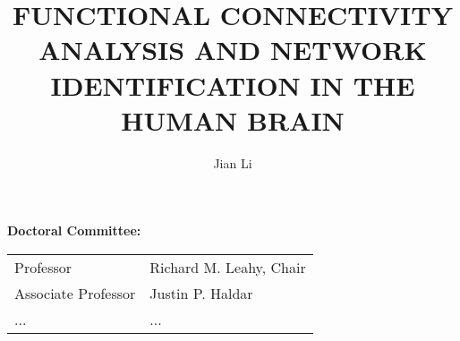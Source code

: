 \documentclass[twoside, 11pt]{report}
\begin{document}
\title{FUNCTIONAL CONNECTIVITY ANALYSIS AND NETWORK IDENTIFICATION IN THE HUMAN BRAIN}
\author{Jian Li}



\begin{preface}
  
  \thispagestyle{empty}
  {\large\textbf{Doctoral Committee:}} %
  
  \begin{singlespace}
    \renewcommand{\arraystretch}{1.3}
    \hspace*{5mm}
    \begin{tabular}{L{35mm}L{50mm}}
      Professor & Richard M. Leahy, Chair\\
      Associate Professor & Justin P. Haldar\\
      ... & ...
    \end{tabular}
    \renewcommand{\arraystretch}{1}
  \end{singlespace}



  
  \tableofcontents
  \listoffigures
  \listoftables
  
  
  

\end{preface}
\cleardoublepage

%
\cleardoublepage

%
\cleardoublepage


%

\end{document}
